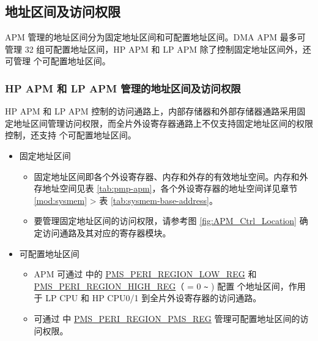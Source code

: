 \documentclass[main\_\_CN.tex]{subfiles}
\begin{document}
\subsection{地址区间及访问权限}
\label{sec:permctrl-addr-region}

APM 管理的地址区间分为固定地址区间和可配置地址区间。DMA APM 最多可管理 32 组可配置地址区间，HP APM 和 LP APM 除了控制固定地址区间外，还可管理  个可配置地址区间。

\subsubsection{HP APM 和 LP APM 管理的地址区间及访问权限}

HP APM 和 LP APM 控制的访问通路上，内部存储器和外部存储器通路采用固定地址区间管理访问权限，而全片外设寄存器通路上不仅支持固定地址区间的权限控制，还支持  个可配置地址区间。

\begin{itemize}
    \item 固定地址区间
    \begin{itemize}
        \item 固定地址区间即各个外设寄存器、内存和外存的有效地址空间。内存和外存地址空间见表 \ref{tab:pmp-apm}，各个外设寄存器的地址空间详见章节 \ref{mod:sysmem} \textit{} > 表 \ref{tab:sysmem-base-address}。
        \item 要管理固定地址区间的访问权限，请参考图 \ref{fig:APM_Ctrl_Location} 确定访问通路及其对应的寄存器模块。
    \end{itemize}
    \item 可配置地址区间
    \begin{itemize}
        \item APM 可通过  中的 \hyperref[fielddesc:PMSPERIREGIONNLOW]{PMS\_PERI\_REGION\_LOW\_REG} 和 \hyperref[fielddesc:PMSPERIREGIONNHIGH]{PMS\_PERI\_REGION\_HIGH\_REG}（ = 0 \verb+~+ ) 配置  个地址区间，作用于 LP CPU 和 HP CPU0/1 到全片外设寄存器的访问通路。
        \item 可通过  中 \hyperref[regdesc:PMSPERIREGIONPMSREG]{PMS\_PERI\_REGION\_PMS\_REG} 管理可配置地址区间的访问权限。
    \end{itemize}
\end{itemize}
\end{document}
